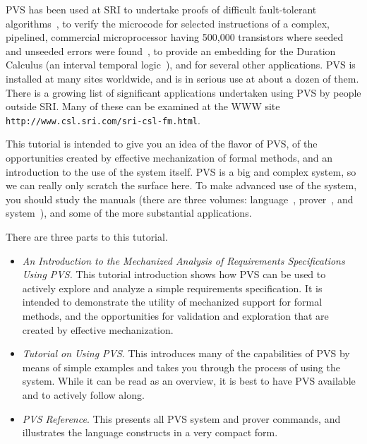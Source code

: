\documentclass[11pt,part]{article}
\begin{document}
PVS has been used at SRI to undertake proofs of difficult
fault-tolerant
algorithms~\cite{Lincoln&Rushby93:CAV,Lincoln&Rushby93:FTCS,Lincoln&Rushby94:FTP},
to verify the microcode for selected instructions of a complex,
pipelined, commercial microprocessor having 500,000 transistors where
seeded and unseeded errors were found~\cite{Miller&Srivas95}, to
provide an embedding for the Duration Calculus (an interval temporal
logic~\cite{Skakkebaek&Shankar94}), and for several other
applications.  PVS is installed at many sites worldwide, and is in
serious use at about a dozen of them.  There is a growing list of
significant applications undertaken using PVS by people outside SRI.
Many of these can be examined at the WWW site {\tt
http://www.csl.sri.com/sri-csl-fm.html}.

This tutorial is intended to give you an idea of the flavor of PVS, of
the opportunities created by effective mechanization of formal
methods, and an introduction to the use of the system itself.  PVS is
a big and complex system, so we can really only scratch the surface
here.  To make advanced use of the system, you should study the
manuals (there are three volumes: language~\cite{PVS:language},
prover~\cite{PVS:prover}, and system~\cite{PVS:userguide}), and some
of the more substantial applications.

There are three parts to this tutorial.
\begin{itemize}

\item {\em An Introduction to the Mechanized Analysis of Requirements
Specifications Using PVS.} This tutorial introduction shows how PVS
can be used to actively explore and analyze a simple requirements
specification.  It is intended to demonstrate the utility of
mechanized support for formal methods, and the opportunities for
validation and exploration that are created by effective
mechanization.


\item {\em Tutorial on Using PVS}.   This introduces many of
the capabilities of PVS by means of simple examples and takes you
through the process of using the system.  While it can be read as an
overview, it is best to have PVS available and to actively follow along.

\item {\em PVS Reference}.    This presents all PVS
system and prover commands, and illustrates the language constructs
in a very compact form.

\end{itemize}
\end{document}
